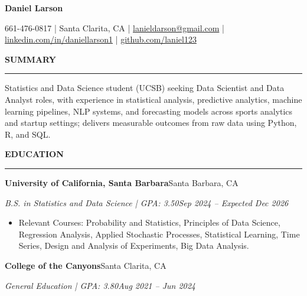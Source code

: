\documentclass[letterpaper,10pt]{article}
\newcommand{\resumeSection}[1]{%
  \vspace{3pt}%
  {\large\bfseries #1}\par
  \vspace{-4pt}\rule{\linewidth}{0.4pt}\par
  \vspace{1pt}%
}
\newcommand{\entry}[4]{%
  \textbf{#1}\hfill #2\par
  \textit{#3}\hfill \textit{#4}\par
}
\newenvironment{bullets}{\begin{itemize}}{\end{itemize}\vspace{1pt}}
\begin{document}
\begin{center}
  {\LARGE\bfseries Daniel Larson}\par
  \vspace{3pt}
  661-476-0817 | Santa Clarita, CA | \href{mailto:lanieldarson@gmail.com}{lanieldarson@gmail.com} |
  \href{https://www.linkedin.com/in/daniellarson1}{linkedin.com/in/daniellarson1} |
  \href{https://github.com/laniel123}{github.com/laniel123}
\end{center}

\resumeSection{SUMMARY}
Statistics and Data Science student (UCSB) seeking Data Scientist and Data Analyst roles, with experience in statistical analysis, predictive analytics, machine learning pipelines, NLP systems, and forecasting models across sports analytics and startup settings; delivers measurable outcomes from raw data using Python, R, and SQL.

\resumeSection{EDUCATION}
\entry{University of California, Santa Barbara}{Santa Barbara, CA}
      {B.S. in Statistics and Data Science | GPA: 3.50}{Sep 2024 -- Expected Dec 2026}
\begin{bullets}
  \item Relevant Courses: Probability and Statistics, Principles of Data Science, Regression Analysis, Applied Stochastic Processes, Statistical Learning, Time Series, Design and Analysis of Experiments, Big Data Analysis.
\end{bullets}
\entry{College of the Canyons}{Santa Clarita, CA}
      {General Education | GPA: 3.80}{Aug 2021 -- Jun 2024}
\end{document}
